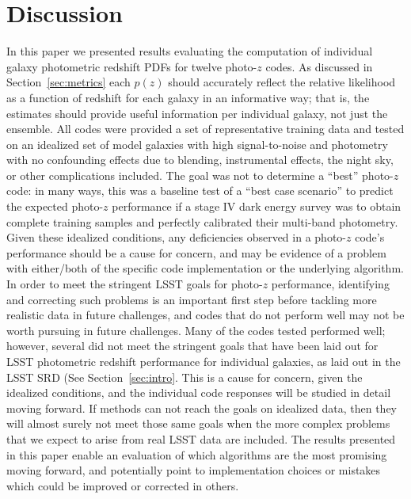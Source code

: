 \section{Discussion}
\label{sec:discussion}
In this paper we presented results evaluating the computation of individual galaxy photometric redshift PDFs for twelve photo-$z$ codes.  As discussed in Section~\ref{sec:metrics} each $p(z)$ should accurately reflect the relative likelihood as a function of redshift for each galaxy in an informative way; that is, the estimates should provide useful information per individual galaxy, not just the ensemble.  All codes were provided a set of representative training data and tested on an idealized set of model galaxies with high signal-to-noise and photometry with no confounding effects due to blending, instrumental effects, the night sky, or other complications included.  The goal was not to determine a ``best'' photo-$z$ code: in many ways, this was a baseline test of a ``best case scenario'' to predict the expected photo-$z$ performance if a stage IV dark energy survey was to obtain complete training samples and perfectly calibrated their multi-band photometry.  Given these idealized conditions, any deficiencies observed in a photo-$z$ code's performance should be a cause for concern, and may be evidence of a problem with either/both of the specific code implementation or the underlying algorithm.  In order to meet the stringent LSST goals for photo-$z$ performance, identifying and correcting such problems is an important first step before tackling more realistic data in future challenges, and codes that do not perform well may not be worth pursuing in future challenges.  Many of the codes tested performed well; however, several did not meet the stringent goals that have been laid out for LSST photometric redshift performance for individual galaxies, as laid out in the LSST SRD (See Section~\ref{sec:intro}.  This is a cause for concern, given the idealized conditions, and the individual code responses will be studied in detail moving forward.  If methods can not reach the goals on idealized data, then they will almost surely not meet those same goals when the more complex problems that we expect to arise from real LSST data are included.  The results presented in this paper enable an evaluation of which algorithms are the most promising moving forward, and potentially point to implementation choices or mistakes which could be improved or corrected in others.

